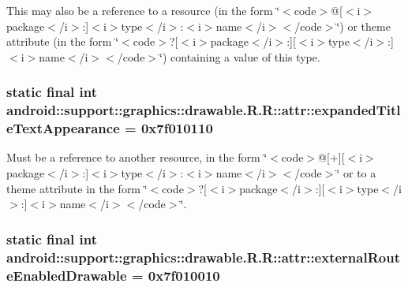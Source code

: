 This may also be a reference to a resource (in the form \char`\"{}$<$code$>$@\mbox{[}$<$i$>$package$<$/i$>$:\mbox{]}$<$i$>$type$<$/i$>$:$<$i$>$name$<$/i$>$$<$/code$>$\char`\"{}) or theme attribute (in the form \char`\"{}$<$code$>$?\mbox{[}$<$i$>$package$<$/i$>$:\mbox{]}\mbox{[}$<$i$>$type$<$/i$>$:\mbox{]}$<$i$>$name$<$/i$>$$<$/code$>$\char`\"{}) containing a value of this type. \hypertarget{classandroid_1_1support_1_1graphics_1_1drawable_1_1_r_1_1attr_8f6fd59f37bb6f11a5124c79cdb5038f}{
\subsubsection[{expandedTitleTextAppearance}]{\setlength{\rightskip}{0pt plus 5cm}static final int android::support::graphics::drawable.R.R::attr::expandedTitleTextAppearance = 0x7f010110}}
\label{classandroid_1_1support_1_1graphics_1_1drawable_1_1_r_1_1attr_8f6fd59f37bb6f11a5124c79cdb5038f}


Must be a reference to another resource, in the form \char`\"{}$<$code$>$@\mbox{[}+\mbox{]}\mbox{[}$<$i$>$package$<$/i$>$:\mbox{]}$<$i$>$type$<$/i$>$:$<$i$>$name$<$/i$>$$<$/code$>$\char`\"{} or to a theme attribute in the form \char`\"{}$<$code$>$?\mbox{[}$<$i$>$package$<$/i$>$:\mbox{]}\mbox{[}$<$i$>$type$<$/i$>$:\mbox{]}$<$i$>$name$<$/i$>$$<$/code$>$\char`\"{}. \hypertarget{classandroid_1_1support_1_1graphics_1_1drawable_1_1_r_1_1attr_d18b6b743056332d2f88648909593f36}{
\subsubsection[{externalRouteEnabledDrawable}]{\setlength{\rightskip}{0pt plus 5cm}static final int android::support::graphics::drawable.R.R::attr::externalRouteEnabledDrawable = 0x7f010010}}
\label{classandroid_1_1support_1_1graphics_1_1drawable_1_1_r_1_1attr_d18b6b743056332d2f88648909593f36}


